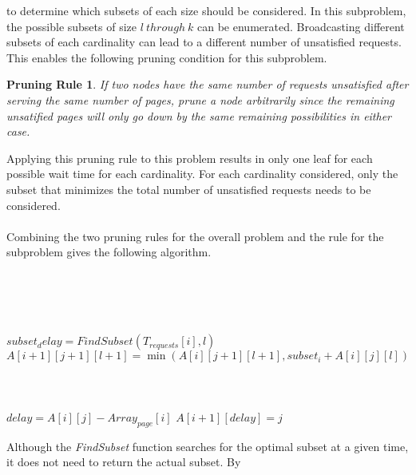 \documentclass[12pt]{article}
\newtheorem*{prune}{Pruning Rule}
\begin{document}
to determine which subsets of each size should be considered.  In this 
subproblem, the possible subsets of size $l\ through\  k$ can be enumerated.
Broadcasting different subsets of each cardinality can lead to a different
number of unsatisfied requests.  This enables the following pruning condition
for this subproblem.
\begin{prune}
If two nodes have the same number of requests unsatisfied after serving
the same number of pages, prune a node arbitrarily since the remaining
unsatified pages will only go down by the same remaining possibilities
in either case.
\end{prune}
Applying this pruning rule to this problem results in only one leaf for
each possible wait time for each cardinality.  For each cardinality
considered, only the subset that minimizes the total number of unsatisfied 
requests needs to be considered.\\\\
Combining the two pruning rules for the overall problem and the rule
for the subproblem gives the following algorithm.\\\\
\begin{algorithm}[H]
\\
\\
\\
    {
        {
           { 
            {
                $subset_delay = FindSubset(T_{requests}[i],l)$
                $A[i+1][j+1][l+1] = \min(A[i][j+1][l+1], subset_i + A[i][j][l])$
            }
        }
    }
    }
\\
\\
\\
\\
    {
        {
                {
                    $delay = A[i][j] - Array_{page}[i]$
                    $A[i+1][delay] = j$
                }
        }
    }
\end{algorithm} 
Although the \textit{FindSubset} function searches for the optimal subset
at a given time, it does not need to return the actual subset.  By 
\end{document}
